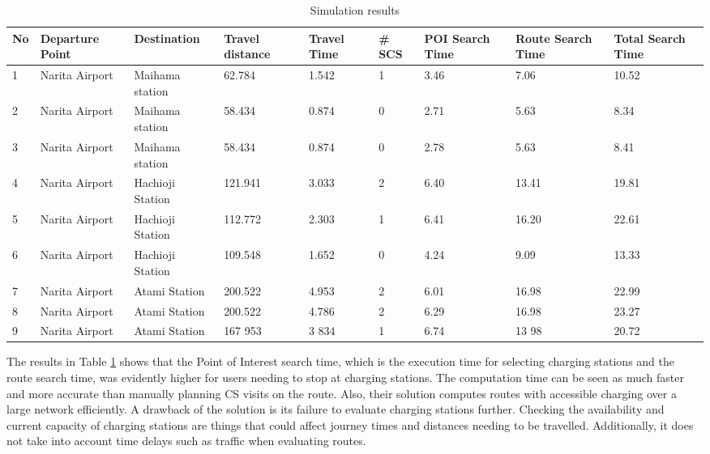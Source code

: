 \documentclass[11pt]{report}
\begin{document}
\begin{table}[h!]
\begin{center}
\begin{tabular}{|p{0.3cm} p{2.2cm} p{2.2cm} p{1.3cm} p{1.3cm} p{0.5cm} p{1.3cm} p{1.3cm} p{1.3cm}|} 
 \hline
 No & Departure Point & Destination & Travel distance & Travel Time & \# SCS & POI Search Time & Route Search Time  & Total Search Time \\
 \hline
 1 & Narita Airport & Maihama station & 62.784 & 1.542 & 1 & 3.46 & 7.06 & 10.52\\ 
 2 & Narita Airport & Maihama station & 58.434 & 0.874 & 0 & 2.71 & 5.63 & 8.34\\
 3 & Narita Airport & Maihama station & 58.434 & 0.874 & 0 & 2.78 & 5.63 & 8.41\\
 4 & Narita Airport & Hachioji Station & 121.941 & 3.033 & 2 & 6.40 & 13.41 & 19.81\\
 5 & Narita Airport & Hachioji Station & 112.772 & 2.303 & 1 & 6.41 & 16.20 & 22.61\\
 6 & Narita Airport & Hachioji Station & 109.548 & 1.652 & 0 & 4.24 & 9.09 & 13.33\\
 7 & Narita Airport & Atami Station & 200.522 & 4.953 & 2 & 6.01 & 16.98 & 22.99\\
 8 & Narita Airport & Atami Station & 200.522 & 4.786 & 2 & 6.29 & 16.98 & 23.27\\
 9 & Narita Airport & Atami Station & 167 953 & 3 834 & 1 & 6.74 & 13 98 & 20.72\\
 \hline
\end{tabular}
\end{center}
\caption{Simulation results \autocite{kobayashi2011route}}
\label{table:1}
\end{table}

The results in Table \ref{table:1} shows that the Point of Interest search time, which is the execution time for selecting charging stations and the route search time, was evidently higher for users needing to stop at charging stations. The computation time can be seen as much faster and more accurate than manually planning CS visits on the route. Also, their solution computes routes with accessible charging over a large network efficiently. A drawback of the solution is its failure to evaluate charging stations further. Checking the availability and current capacity of charging stations are things that could affect journey times and distances needing to be travelled. Additionally, it does not take into account time delays such as traffic when evaluating routes.
\end{document}
